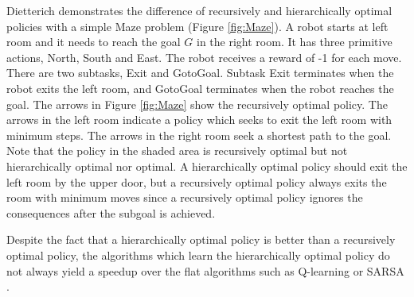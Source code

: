 Dietterich \cite{MaxQJ} demonstrates the difference of recursively and hierarchically optimal policies 
with a simple Maze problem (Figure \ref{fig:Maze}). A robot starts at left room and it needs to reach 
the goal $G$ in the right room. It has three primitive actions, North, South and East.  
The robot receives a reward of -1 for each move.
There are two subtasks, Exit and GotoGoal. Subtask Exit terminates when the robot exits the left room,
and GotoGoal terminates when the robot reaches the goal. The arrows in Figure \ref{fig:Maze} show the 
recursively optimal policy. The arrows in the left room indicate a policy which seeks to exit
the left room with minimum steps. The arrows in the right room seek a shortest path to the goal.
Note that the policy in the shaded area is recursively optimal but not hierarchically optimal nor
optimal. A hierarchically optimal policy should exit the left room by the upper door, but a recursively 
optimal policy always exits the room with minimum moves since
a recursively optimal policy ignores the consequences after the subgoal is achieved. 

Despite the fact that a hierarchically optimal policy is better than a recursively optimal policy, 
the algorithms which learn the hierarchically optimal policy do not always yield a speedup over
the flat algorithms such as Q-learning or SARSA \cite{MaxQJ, Andre02}. 

\ \\
\ \\
\ \\
\ \\
\ \\
\ \\
\ \\
\ \\
\ \\
\ \\
\ \\
\ \\
\ \\
\ \\
\ \\
\ \\
\ \\
\ \\
\ \\
\ \\
\ \\
\ \\
\ \\
\ \\
\ \\


